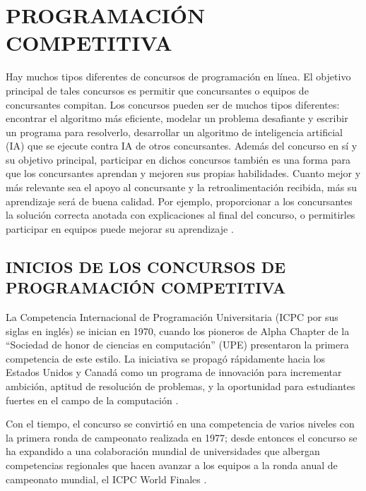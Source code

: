 \section{PROGRAMACIÓN COMPETITIVA}

Hay muchos tipos diferentes de concursos de programación en línea. El objetivo principal de tales concursos es permitir que concursantes o equipos de concursantes compitan. Los concursos pueden ser de muchos tipos diferentes: encontrar el algoritmo más eficiente, modelar un problema desafiante y escribir un programa para resolverlo, desarrollar un algoritmo de inteligencia artificial (IA) que se ejecute contra IA de otros concursantes. Además del concurso en sí y su objetivo principal, participar en dichos concursos también es una forma para que los concursantes aprendan y mejoren sus propias habilidades. Cuanto mejor y más relevante sea el apoyo al concursante y la retroalimentación recibida, más su aprendizaje será de buena calidad. Por ejemplo, proporcionar a los concursantes la solución correcta anotada con explicaciones al final del concurso, o permitirles participar en equipos puede mejorar su aprendizaje \citep{Combéfis-Wautelet}.

\subsection{INICIOS DE LOS CONCURSOS DE PROGRAMACIÓN COMPETITIVA}
La Competencia Internacional de Programación Universitaria (ICPC por sus siglas en inglés) se inician en 1970, cuando los pioneros de Alpha Chapter de la “Sociedad de honor de ciencias en computación” (UPE) presentaron la primera competencia de este estilo. La iniciativa se propagó rápidamente hacia los Estados Unidos y Canadá como un programa de innovación para incrementar ambición, aptitud de resolución de problemas, y la oportunidad para estudiantes fuertes en el campo de la computación \citep{icpc-glogal}.

Con el tiempo, el concurso se convirtió en una competencia de varios niveles con la primera ronda de campeonato realizada en 1977; desde entonces el concurso se ha expandido a una colaboración mundial de universidades que albergan competencias regionales que hacen avanzar a los equipos a la ronda anual de campeonato mundial, el ICPC World Finales \citep{icpc-glogal}.

